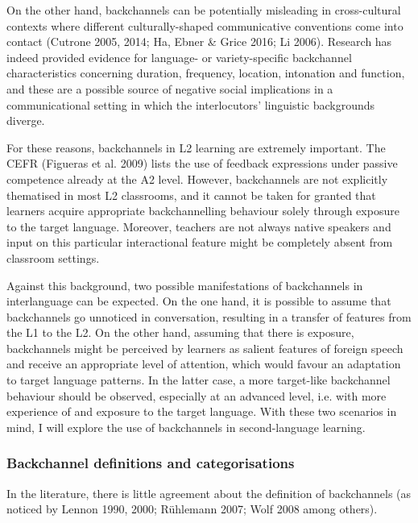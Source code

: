 \begin{styleStandard}
On the other hand, backchannels can be potentially misleading in cross-cultural contexts where different culturally-shaped communicative conventions come into contact (Cutrone 2005, 2014; Ha, Ebner \& Grice 2016; Li 2006). Research has indeed provided evidence for language- or variety-specific backchannel characteristics concerning duration, frequency, location, intonation and function, and these are a possible source of negative social implications in a communicational setting in which the interlocutors’ linguistic backgrounds diverge.
\end{styleStandard}

\begin{styleStandard}
For these reasons, backchannels in L2 learning are extremely important. The CEFR (Figueras et al. 2009) lists the use of feedback expressions under passive competence already at the A2 level. However, backchannels are not explicitly thematised in most L2 classrooms, and it cannot be taken for granted that learners acquire appropriate backchannelling behaviour solely through exposure to the target language. Moreover, teachers are not always native speakers and input on this particular interactional feature might be completely absent from classroom settings.
\end{styleStandard}

\begin{styleStandard}
Against this background, two possible manifestations of backchannels in interlanguage can be expected. On the one hand, it is possible to assume that backchannels go unnoticed in conversation, resulting in a transfer of features from the L1 to the L2. On the other hand, assuming that there is exposure, backchannels might be perceived by learners as salient features of foreign speech and receive an appropriate level of attention, which would favour an adaptation to target language patterns. In the latter case, a more target-like backchannel behaviour should be observed, especially at an advanced level, i.e. with more experience of and exposure to the target language. With these two scenarios in mind, I will explore the use of backchannels in second-language learning.
\end{styleStandard}

\subsubsection{Backchannel definitions and categorisations}
\hypertarget{Toc191305944}{}\begin{styleStandard}
In the literature, there is little agreement about the definition of backchannels (as noticed by Lennon 1990, 2000; Rühlemann 2007; Wolf 2008 among others).
\end{styleStandard}

